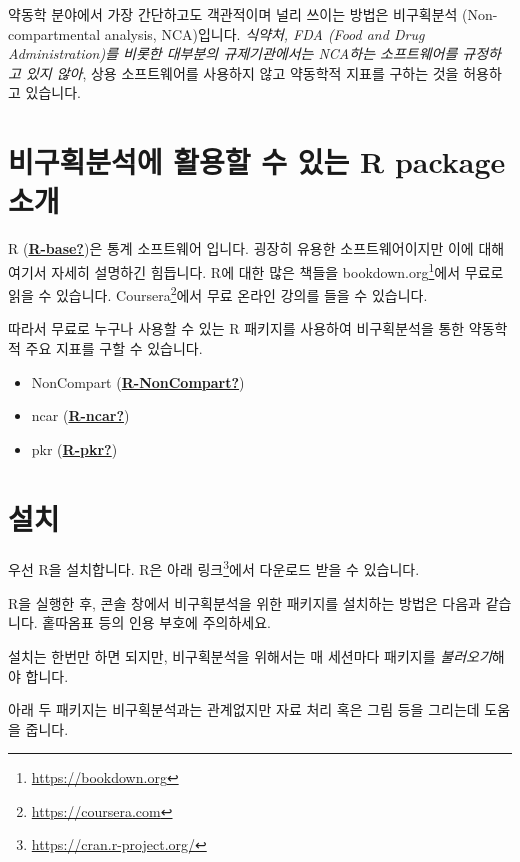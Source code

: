 \documentclass[
  11pt,
  krantz2, a4paper, twoside]{krantz}
\providecommand{\tightlist}{%
  \setlength{\itemsep}{0pt}\setlength{\parskip}{0pt}}
\begin{document}
약동학 분야에서 가장 간단하고도 객관적이며 널리 쓰이는 방법은 비구획분석 (Non-compartmental analysis, NCA)입니다.
\emph{식약처, FDA (Food and Drug Administration)를 비롯한 대부분의 규제기관에서는 NCA하는 소프트웨어를 규정하고 있지 않아}, 상용 소프트웨어를 사용하지 않고 약동학적 지표를 구하는 것을 허용하고 있습니다.

\hypertarget{uxbe44uxad6cuxd68duxbd84uxc11duxc5d0-uxd65cuxc6a9uxd560-uxc218-uxc788uxb294-r-package-uxc18cuxac1c}{%
\section{비구획분석에 활용할 수 있는 R package 소개}\label{uxbe44uxad6cuxd68duxbd84uxc11duxc5d0-uxd65cuxc6a9uxd560-uxc218-uxc788uxb294-r-package-uxc18cuxac1c}}

R (\protect\hyperlink{ref-R-base}{\textbf{R-base?}})은 통계 소프트웨어 입니다.
굉장히 유용한 소프트웨어이지만 이에 대해 여기서 자세히 설명하긴 힘듭니다.
R에 대한 많은 책들을 bookdown.org\footnote{\url{https://bookdown.org}}에서 무료로 읽을 수 있습니다.
Coursera\footnote{\url{https://coursera.com}}에서 무료 온라인 강의를 들을 수 있습니다.

따라서 무료로 누구나 사용할 수 있는 R 패키지를 사용하여 비구획분석을 통한 약동학적 주요 지표를 구할 수 있습니다.

\begin{itemize}
\tightlist
\item
  NonCompart (\protect\hyperlink{ref-R-NonCompart}{\textbf{R-NonCompart?}})
\item
  ncar (\protect\hyperlink{ref-R-ncar}{\textbf{R-ncar?}})
\item
  pkr (\protect\hyperlink{ref-R-pkr}{\textbf{R-pkr?}})
\end{itemize}

\hypertarget{uxc124uxce58}{%
\section{설치}\label{uxc124uxce58}}

우선 R을 설치합니다.
R은 아래 링크\footnote{\url{https://cran.r-project.org/}}에서 다운로드 받을 수 있습니다.

R을 실행한 후, 콘솔 창에서 비구획분석을 위한 패키지를 설치하는 방법은 다음과 같습니다.
홑따옴표 등의 인용 부호에 주의하세요.

설치는 한번만 하면 되지만, 비구획분석을 위해서는 매 세션마다 패키지를 \emph{불러오기}해야 합니다.

아래 두 패키지는 비구획분석과는 관계없지만 자료 처리 혹은 그림 등을 그리는데 도움을 줍니다.
\end{document}
